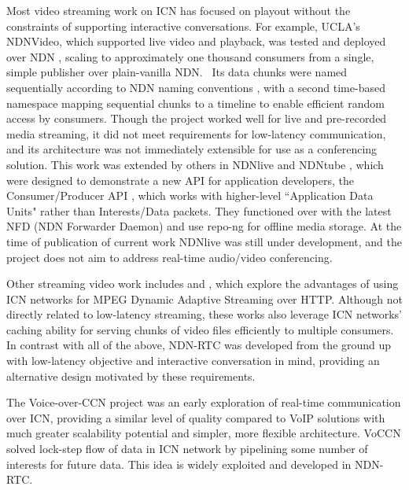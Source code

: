 \documentclass{icn/sig-alternate-2013} %
\newcommand{\ndnrtcName}{NDN-RTC} %
\begin{document}
Most video streaming work on ICN has focused on playout without the constraints of supporting interactive conversations.  For example, UCLA's NDNVideo, which supported live video and playback, was tested and deployed over NDN \cite{ndnvideo}, scaling to approximately one thousand consumers from a single, simple publisher over plain-vanilla NDN.~\cite{CrowleyNEAPresentation} Its data chunks were named sequentially according to NDN naming conventions \cite{ndnnaming}, with a second time-based namespace mapping sequential chunks to a timeline to enable efficient random access by consumers. Though the project worked well for live and pre-recorded media streaming, it did not meet requirements for low-latency communication, and its architecture was not immediately extensible for use as a conferencing solution. This work was extended by others in NDNlive and NDNtube \cite{ndnlive-tube}, which were designed to demonstrate  a new API for application developers, the Consumer/Producer API \cite{cons-prod-api}, which works with higher-level ``Application Data Units" rather than Interests/Data packets.  They functioned over with the latest NFD (NDN Forwarder Daemon) and use repo-ng \cite{repo-ng} for offline media storage. At the time of publication of current work NDNlive was still under development, and the project does not aim to address real-time audio/video conferencing.  

Other streaming video work includes \cite{ccn-dash} and \cite{ndn-dash}, which explore the advantages of using ICN networks for MPEG Dynamic Adaptive Streaming over HTTP. Although not directly related to low-latency streaming, these works also leverage ICN networks' caching ability for serving chunks of video files efficiently to multiple consumers.
In contrast with all of the above, \ndnrtcName{} was developed from the ground up with low-latency objective and interactive conversation in mind, providing an alternative design motivated by these requirements. %

The Voice-over-CCN project \cite{voccn} was an early exploration of real-time communication over ICN, providing a similar level of quality compared to VoIP solutions with much greater scalability potential and simpler, more flexible architecture. VoCCN solved lock-step flow of data in ICN network by pipelining some number of interests for future data. This idea is widely exploited and developed in \ndnrtcName{}.
\end{document}
